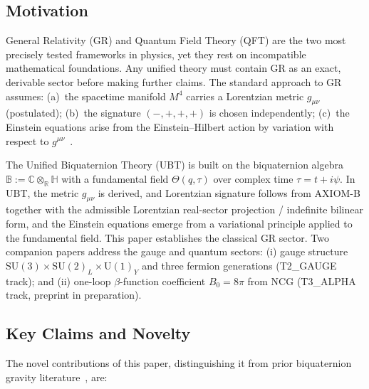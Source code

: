 \documentclass[12pt,a4paper]{article}
\theoremstyle{definition}
\theoremstyle{remark}
\newcommand{\BB}{\mathbb{B}}
\newcommand{\CC}{\mathbb{C}}
\newcommand{\RR}{\mathbb{R}}
\newcommand{\HH}{\mathbb{H}}
\begin{document}
\subsection{Motivation}

General Relativity (GR) and Quantum Field Theory (QFT) are the two most
precisely tested frameworks in physics, yet they rest on incompatible
mathematical foundations.
Any unified theory must contain GR as an exact, derivable sector before
making further claims.
The standard approach to GR assumes:
(a)~the spacetime manifold $M^4$ carries a Lorentzian metric $g_{\mu\nu}$
(postulated);
(b)~the signature $(-,+,+,+)$ is chosen independently;
(c)~the Einstein equations arise from the Einstein--Hilbert action by
variation with respect to $g^{\mu\nu}$~\cite{einstein1915,hilbert1915}.

The Unified Biquaternion Theory (UBT) is built on the biquaternion algebra
$\BB := \CC\otimes_\RR\HH$ with a fundamental field
$\Theta(q,\tau)$ over complex time $\tau = t + i\psi$.
In UBT, the metric $g_{\mu\nu}$ is derived, and Lorentzian signature follows from AXIOM-B together with the admissible Lorentzian real-sector projection / indefinite bilinear form,
and the Einstein equations emerge from a variational principle applied to
the fundamental field.
This paper establishes the classical GR sector.
Two companion papers address the gauge and quantum sectors:
(i) gauge structure $\mathrm{SU}(3)\times\mathrm{SU}(2)_L\times\mathrm{U}(1)_Y$
and three fermion generations (T2\_GAUGE track); and
(ii) one-loop $\beta$-function coefficient $B_0=8\pi$ from NCG
(T3\_ALPHA track, preprint in preparation).

\subsection{Key Claims and Novelty}

The novel contributions of this paper, distinguishing it from prior biquaternion
gravity literature~\cite{adler1995,finkelstein1962,deleo1996}, are:
\end{document}

